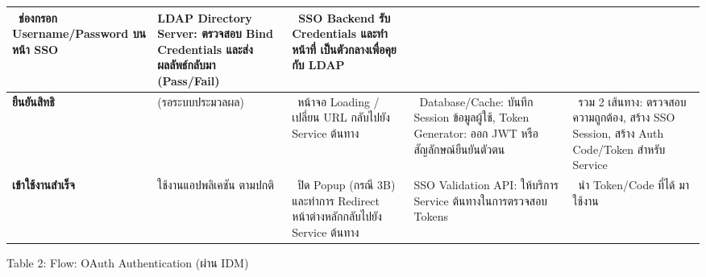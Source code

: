 \begin{tabular}{|p{3cm}|p{3cm}|p{3cm}|p{3cm}|p{3cm}|}
\begin{minipage}[t]{2.5cm}
\ ช่องกรอก Username/Password บนหน้า SSO
\end{minipage} & \begin{minipage}[t]{2.5cm}\raggedright
LDAP Directory Server: ตรวจสอบ Bind Credentials และส่งผลลัพธ์กลับมา (Pass/Fail)
\end{minipage} & \begin{minipage}[t]{2.5cm}\raggedright
\ SSO Backend รับ Credentials และทำหน้าที่ เป็นตัวกลางเพื่อคุยกับ LDAP
\end{minipage} \\
\hline
\textbf{ยืนยันสิทธิ} & \begin{minipage}[t]{2.5cm}\raggedright
(รอระบบประมวลผล)
\end{minipage} & \begin{minipage}[t]{2.5cm}\raggedright
\ หน้าจอ Loading / เปลี่ยน URL กลับไปยัง Service ต้นทาง
\end{minipage} & \begin{minipage}[t]{2.5cm}\raggedright
\ Database/Cache: บันทึก Session ข้อมูลผู้ใช้, Token Generator: ออก JWT หรือสัญลักษณ์ยืนยันตัวตน
\end{minipage} & \begin{minipage}[t]{2.5cm}\raggedright
\ รวม 2 เส้นทาง: ตรวจสอบความถูกต้อง, สร้าง SSO Session, สร้าง Auth Code/Token สำหรับ Service
\end{minipage} \\
\hline
\textbf{เข้าใช้งานสำเร็จ} & \begin{minipage}[t]{2.5cm}\raggedright
ใช้งานแอปพลิเคชัน ตามปกติ
\end{minipage} & \begin{minipage}[t]{2.5cm}\raggedright
\ ปิด Popup (กรณี 3B) และทำการ Redirect หน้าต่างหลักกลับไปยัง Service ต้นทาง
\end{minipage} & \begin{minipage}[t]{2.5cm}\raggedright
SSO Validation API: ให้บริการ Service ต้นทางในการตรวจสอบ Tokens
\end{minipage} & \begin{minipage}[t]{2.5cm}\raggedright
\ นำ Token/Code ที่ได้ มาใช้งาน
\end{minipage} \\
\hline
\end{tabular}


\newpage
Table 2: Flow: OAuth Authentication (ผ่าน IDM)

